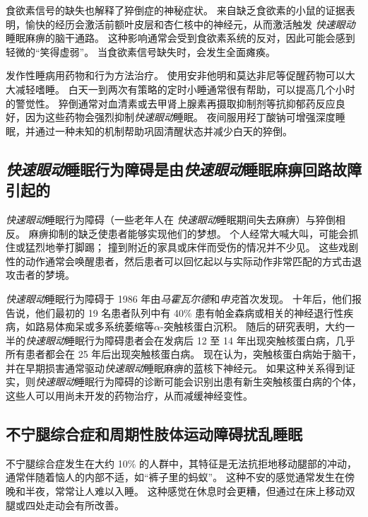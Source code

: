 食欲素信号的缺失也解释了猝倒症的神秘症状。
来自缺乏食欲素的小鼠的证据表明，愉快的经历会激活前额叶皮层和杏仁核中的神经元，从而激活触发 \textit{快速眼动}睡眠麻痹的脑干通路。
这种影响通常会受到食欲素系统的反对，因此可能会感到轻微的“笑得虚弱”。
当食欲素信号缺失时，会发生全面瘫痪。


发作性睡病用药物和行为方法治疗。
使用安非他明和莫达非尼等促醒药物可以大大减轻嗜睡。
白天一到两次有策略的定时小睡通常很有帮助，可以提高几个小时的警觉性。
猝倒通常对血清素或去甲肾上腺素再摄取抑制剂等抗抑郁药反应良好，因为这些药物会强烈抑制\textit{快速眼动}睡眠。
夜间服用羟丁酸钠可增强深度睡眠，并通过一种未知的机制帮助巩固清醒状态并减少白天的猝倒。



\subsection{\textit{快速眼动}睡眠行为障碍是由\textit{快速眼动}睡眠麻痹回路故障引起的}

\textit{快速眼动}睡眠行为障碍（一些老年人在 \textit{快速眼动}睡眠期间失去麻痹）与猝倒相反。
麻痹抑制的缺乏使患者能够实现他们的梦想。
个人经常大喊大叫，可能会抓住或猛烈地拳打脚踢；
撞到附近的家具或床伴而受伤的情况并不少见。
这些戏剧性的动作通常会唤醒患者，然后患者可以回忆起以与实际动作非常匹配的方式击退攻击者的梦境。


\textit{快速眼动}睡眠行为障碍于 1986 年由\textit{马霍瓦尔德}和\textit{申克}首次发现。
十年后，他们报告说，他们最初的 19 名患者队列中有 40\% 患有帕金森病或相关的神经退行性疾病，如路易体痴呆或多系统萎缩等$ \alpha $-突触核蛋白沉积。
随后的研究表明，大约一半的\textit{快速眼动}睡眠行为障碍患者会在发病后 12 至 14 年出现突触核蛋白病，几乎所有患者都会在 25 年后出现突触核蛋白病。
现在认为，突触核蛋白病始于脑干，并在早期损害通常驱动\textit{快速眼动}睡眠麻痹的蓝核下神经元。
如果这种关系得到证实，则\textit{快速眼动}睡眠行为障碍的诊断可能会识别出患有新生突触核蛋白病的个体，这些人可以用尚未开发的药物治疗，从而减缓神经变性。



\subsection{不宁腿综合症和周期性肢体运动障碍扰乱睡眠}

不宁腿综合症发生在大约 10\% 的人群中，其特征是无法抗拒地移动腿部的冲动，通常伴随着恼人的内部不适，如“裤子里的蚂蚁”。
这种不安的感觉通常发生在傍晚和半夜，常常让人难以入睡。
这种感觉在休息时会更糟，但通过在床上移动双腿或四处走动会有所改善。


